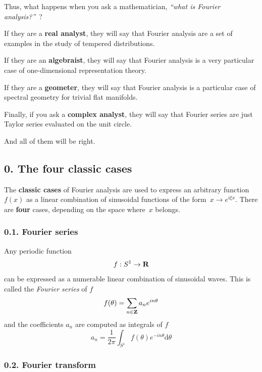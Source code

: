 Thus, what happens when you ask a mathematician, \emph{``what is
Fourier analysis?''}~?

If they are a {\bf real analyst}, they will say that Fourier analysis
are a set of examples in the study of tempered distributions.

If they are an {\bf algebraist}, they will say that Fourier analysis
is a very particular case of one-dimensional representation theory.

If they are a {\bf geometer}, they will say that Fourier analysis is
a particular case of spectral geometry for trivial flat manifolds.

Finally, if you ask a {\bf complex analyst}, they will say that
Fourier series are just Taylor series evaluated on the unit circle.

And all of them will be right.




\subsection{0. The four classic cases}

The {\bf classic cases} of Fourier analysis are used to express an
arbitrary function~$f(x)$ as a linear combination of sinusoidal functions
of the form~$x\to e^{i\xi x}$.  There are {\bf four} cases, depending on
the space where~$x$ belongs.

\subsubsection{0.1. Fourier series}

Any periodic function
$$
f:S^1\to\mathbf{R}
$$
can be expressed as a numerable linear combination of sinusoidal waves. This is
called the \emph{Fourier series} of $f$
$$
	f(\theta) = \sum_{n\in\mathbf{Z}} a_n e^{in\theta}
$$
and the coefficients $a_n$ are computed as integrals of $f$
$$
	a_n = \frac{1}{2\pi}\int_{S^1} f(\theta) e^{-in\theta}
\mathrm{d}\theta
$$


\subsubsection{0.2. Fourier transform}

